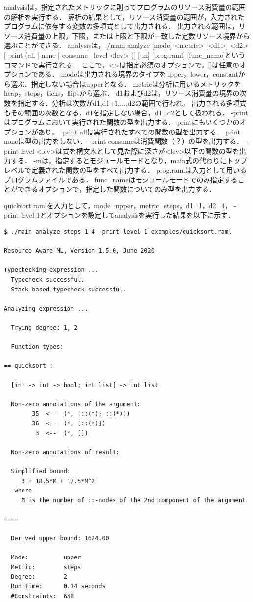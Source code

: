 \documentclass{kuisthesis}
\begin{document}
analysisは，指定されたメトリックに則ってプログラムのリソース消費量の範囲の解析を実行する．
解析の結果として，リソース消費量の範囲が，入力されたプログラムに依存する変数の多項式として出力される．
出力される範囲は，リソース消費量の上限，下限，または上限と下限が一致した定数リソース境界から選ぶことができる．
analysisは，./main analyze [mode] <metric> [<d1>] <d2> [-print (all | none | consume | level <lev> )] [-m] [prog.raml] [func\_name]というコマンドで実行される．
ここで，<>は指定必須のオプションで，[]は任意のオプションである．
modeは出力される境界のタイプをupper，lower，constantから選ぶ．指定しない場合はupperとなる．
metricは分析に用いるメトリックをheap，steps，ticks，flipsから選ぶ．
d1およびd2は，リソース消費量の境界の次数を指定する．分析は次数がd1,d1+1,...,d2の範囲で行われ，
出力される多項式もその範囲の次数となる．d1を指定しない場合，d1=d2として扱われる．
-printはプログラムにおいて実行された関数の型を出力する．-printにもいくつかのオプションがあり，
-print allは実行されたすべての関数の型を出力する．-print noneは型の出力をしない．
-print consumeは消費関数（？）の型を出力する．
-print level <lev>は式を構文木として見た際に深さが<lev>以下の関数の型を出力する．
-mは，指定するとモジュールモードとなり，main式の代わりにトップレベルで定義された関数の型をすべて出力する．
prog.ramlは入力として用いるプログラムファイルである．
func\_nameはモジュールモードでのみ指定することができるオプションで，指定した関数についてのみ型を出力する．

quicksort.ramlを入力として，mode=upper，metric=steps，d1=1，d2=4，
-print level 1とオプションを設定してanalysisを実行した結果を以下に示す．
\\

\begin{lstlisting}[basicstyle={\ttfamily\color{base}\scriptsize}]
$ ./main analyze steps 1 4 -print level 1 examples/quicksort.raml

Resource Aware ML, Version 1.5.0, June 2020

Typechecking expression ...
  Typecheck successful.
  Stack-based typecheck successful.

Analyzing expression ...

  Trying degree: 1, 2

  Function types:

== quicksort :

  [int -> int -> bool; int list] -> int list

  Non-zero annotations of the argument:
        35  <--  (*, [::(*); ::(*)])
        36  <--  (*, [::(*)])
         3  <--  (*, [])

  Non-zero annotations of result:

  Simplified bound:
     3 + 18.5*M + 17.5*M^2
   where
     M is the number of ::-nodes of the 2nd component of the argument

====

  Derived upper bound: 1624.00

  Mode:          upper
  Metric:        steps
  Degree:        2
  Run time:      0.14 seconds
  #Constraints:  638
\end{lstlisting}
\end{document}
